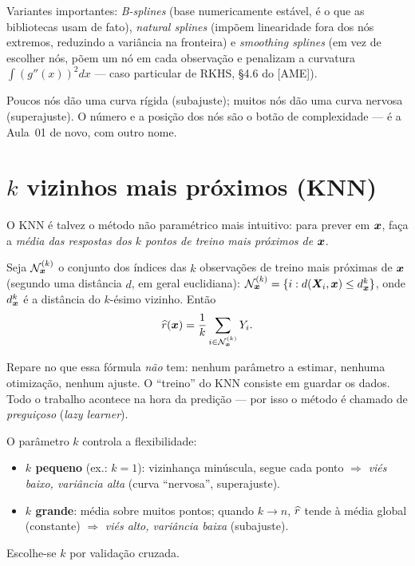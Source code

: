 \documentclass[11pt,a4paper]{article}
\begin{document}
\noindent Variantes importantes: \emph{B-splines} (base numericamente estável, é o
que as bibliotecas usam de fato), \emph{natural splines} (impõem linearidade fora
dos nós extremos, reduzindo a variância na fronteira) e \emph{smoothing splines} (em vez de escolher nós, põem um
nó em cada observação e penalizam a curvatura $\int (g''(x))^2dx$ --- caso
particular de RKHS, §4.6 do [AME]).

Poucos nós dão uma curva rígida (subajuste); muitos nós dão uma curva nervosa
(superajuste). O número e a posição dos nós são o botão de complexidade --- é a
Aula~01 de novo, com outro nome.

\section{$k$ vizinhos mais próximos (KNN)}
O KNN é talvez o método não paramétrico mais intuitivo: para prever em $\bm{x}$, faça
a \emph{média das respostas dos $k$ pontos de treino mais próximos de $\bm{x}$}.

\begin{definicao}
Seja $\mathcal{N}_{\bm{x}}^{(k)}$ o conjunto dos índices das $k$ observações de treino mais
próximas de $\bm{x}$ (segundo uma distância $d$, em geral euclidiana):
$\mathcal{N}_{\bm{x}}^{(k)}=\{i : d(\bm{X}_i,\bm{x})\le d^{k}_{\bm{x}}\}$, onde $d^k_{\bm{x}}$ é a distância
do $k$-ésimo vizinho. Então
\begin{equation}\label{eq:knn}
  \widehat{r}(\bm{x}) = \frac{1}{k}\sum_{i\in\mathcal{N}_{\bm{x}}^{(k)}} Y_i .
\end{equation}
\end{definicao}

Repare no que essa fórmula \emph{não} tem: nenhum parâmetro a estimar, nenhuma
otimização, nenhum ajuste. O ``treino'' do KNN consiste em guardar os dados. Todo o
trabalho acontece na hora da predição --- por isso o método é chamado de
\emph{preguiçoso} (\emph{lazy learner}).

O parâmetro $k$ controla a flexibilidade:
\begin{itemize}[leftmargin=1.4cm]
  \item \textbf{$k$ pequeno} (ex.: $k=1$): vizinhança minúscula, segue cada ponto
        $\Rightarrow$ \emph{viés baixo, variância alta} (curva ``nervosa'',
        superajuste).
  \item \textbf{$k$ grande}: média sobre muitos pontos; quando $k\to n$, $\widehat{r}$
        tende à média global (constante) $\Rightarrow$ \emph{viés alto, variância
        baixa} (subajuste).
\end{itemize}
Escolhe-se $k$ por validação cruzada.
\end{document}
